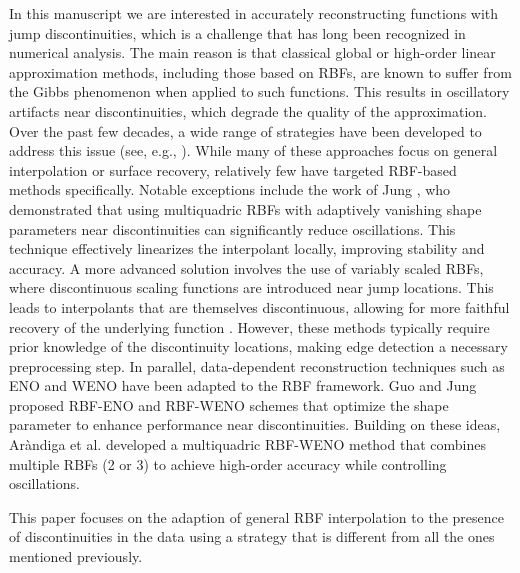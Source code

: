 \documentclass[preprint]{elsarticle}       %
\begin{document}
In this manuscript we are interested in accurately reconstructing functions with jump discontinuities, which is a challenge that has long been recognized in numerical analysis. The main reason is that classical global or high-order linear approximation methods, including those based on RBFs, are known to suffer from the Gibbs phenomenon when applied to such functions. This results in oscillatory artifacts near discontinuities, which degrade the quality of the approximation. Over the past few decades, a wide range of strategies have been developed to address this issue (see, e.g., \cite{Amir2018,Arandiga2005,Bozzini2013,Bozzini2014,Crampton2005,Gout2008,Lenarduzzi2017}). While many of these approaches focus on general interpolation or surface recovery, relatively few have targeted RBF-based methods specifically. Notable exceptions include the work of Jung \cite{Jung2007}, who demonstrated that using multiquadric RBFs with adaptively vanishing shape parameters near discontinuities can significantly reduce oscillations. This technique effectively linearizes the interpolant locally, improving stability and accuracy. A more advanced solution involves the use of variably scaled RBFs, where discontinuous scaling functions are introduced near jump locations. This leads to interpolants that are themselves discontinuous, allowing for more faithful recovery of the underlying function \cite{DeMarchi2019,Romani2018,Erb2019}. However, these methods typically require prior knowledge of the discontinuity locations, making edge detection a necessary preprocessing step. In parallel, data-dependent reconstruction techniques such as ENO and WENO have been adapted to the RBF framework. Guo and Jung \cite{Guo2017a,Guo2017b} proposed RBF-ENO and RBF-WENO schemes that optimize the shape parameter to enhance performance near discontinuities. Building on these ideas, Ar\`andiga et al. \cite{Arandiga2020} developed a multiquadric RBF-WENO method that combines multiple RBFs (2 or 3) to achieve high-order accuracy while controlling oscillations.



This paper focuses on the adaption of general RBF interpolation to the presence of discontinuities in the data using a strategy that is different from all the ones mentioned previously. 
\end{document}
